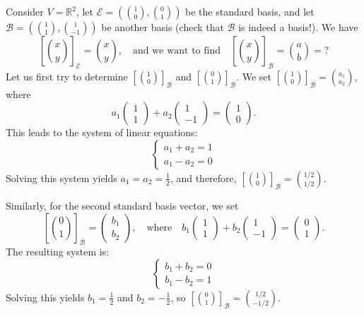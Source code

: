 \begin{example}
\label{ex:coordinate_vector_calculation}
Consider $V = \mathbb{R}^2$, let $\mathcal{E} = \left(\binom{1}{0}, \binom{0}{1}\right)$ be the standard basis, and let $\mathcal{B} = \left(\binom{1}{1}, \binom{1}{-1}\right)$ be another basis (check that $\mathcal{B}$ is indeed a basis!). We have
\[
\left[\binom{x}{y}\right]_{\mathcal{E}} = \binom{x}{y}, \quad \text{and we want to find} \quad \left[\binom{x}{y}\right]_{\mathcal{B}} = \binom{a}{b} = ?
\]
Let us first try to determine $\left[\binom{1}{0}\right]_{\mathcal{B}}$ and $\left[\binom{0}{1}\right]_{\mathcal{B}}$. We set $\left[\binom{1}{0}\right]_{\mathcal{B}} = \binom{a_1}{a_2}$, where
\[
a_1 \begin{pmatrix} 1 \\ 1 \end{pmatrix} + a_2 \begin{pmatrix} 1 \\ -1 \end{pmatrix} = \begin{pmatrix} 1 \\ 0 \end{pmatrix}.
\]
This leads to the system of linear equations:
\[
\begin{cases}
a_1 + a_2 = 1 \\
a_1 - a_2 = 0
\end{cases}
\]
Solving this system yields $a_1 = a_2 = \frac{1}{2}$, and therefore, $\left[\binom{1}{0}\right]_{\mathcal{B}} = \binom{1/2}{1/2}$.

Similarly, for the second standard basis vector, we set
\[
\left[\binom{0}{1}\right]_{\mathcal{B}} = \begin{pmatrix} b_1 \\ b_2 \end{pmatrix}, \quad \text{where} \quad b_1 \begin{pmatrix} 1 \\ 1 \end{pmatrix} + b_2 \begin{pmatrix} 1 \\ -1 \end{pmatrix} = \begin{pmatrix} 0 \\ 1 \end{pmatrix}.
\]
The resulting system is:
\[
\begin{cases}
b_1 + b_2 = 0 \\
b_1 - b_2 = 1
\end{cases}
\]
Solving this yields $b_1 = \frac{1}{2}$ and $b_2 = -\frac{1}{2}$, so $\left[\binom{0}{1}\right]_{\mathcal{B}} = \binom{1/2}{-1/2}$.


\end{example}
